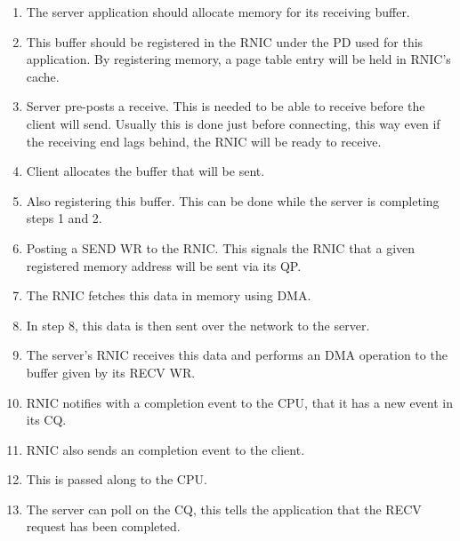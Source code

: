 \begin{enumerate}
    \item The server application should allocate memory for its receiving buffer.
    \item This buffer should be registered in the RNIC under the PD used for this application.
    By registering memory, a page table entry will be held in RNIC's cache.
    \item Server pre-posts a receive.
    This is needed to be able to receive before the client will send.
    Usually this is done just before connecting, this way even if the receiving end lags behind, the RNIC will be ready to receive.
    \item Client allocates the buffer that will be sent.
    \item Also registering this buffer.
    This can be done while the server is completing steps 1 and 2.
    \item Posting a SEND WR to the RNIC.
    This signals the RNIC that a given registered memory address will be sent via its QP.
    \item The RNIC fetches this data in memory using DMA.
    \item In step 8, this data is then sent over the network to the server.
    \item The server's RNIC receives this data and performs an DMA operation to the buffer given by its RECV WR.
    \item RNIC notifies with a completion event to the CPU, that it has a new event in its CQ.
    \item RNIC also sends an completion event to the client.
    \item This is passed along to the CPU.
    \item The server can poll on the CQ, this tells the application that the RECV request has been completed.
\end{enumerate}


